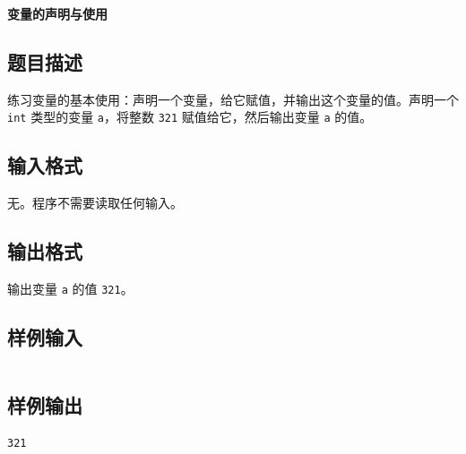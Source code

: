 \documentclass{article}
\newcommand{\problemname}[1]{\begin{center}\Large\bfseries #1\end{center}}
\begin{document}
\problemname{变量的声明与使用}

\subsection*{题目描述}
练习变量的基本使用：声明一个变量，给它赋值，并输出这个变量的值。声明一个 \texttt{int} 类型的变量 \texttt{a}，将整数 \texttt{321} 赋值给它，然后输出变量 \texttt{a} 的值。

\subsection*{输入格式}
无。程序不需要读取任何输入。

\subsection*{输出格式}
输出变量 \texttt{a} 的值 \texttt{321}。

\subsection*{样例输入}
\begin{verbatim}

\end{verbatim}

\subsection*{样例输出}
\begin{verbatim}
321
\end{verbatim}
\end{document}
